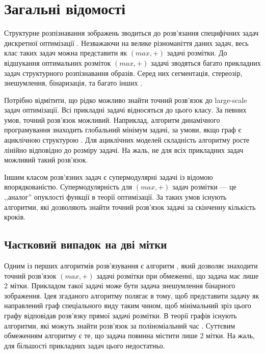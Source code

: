 \section{Загальні відомості}

\vspace{-\baselineskip}

Структурне розпізнавання зображень зводиться до розв'язання специфічних
задач дискретної оптимізації \cite{SchlGig_1_usim2007, Boykov, Boykov_2, savchynskyy}. Незважаючи на велике різноманіття даних задач,
весь клас таких задач можна представити як \((max,+)\) задачі розмітки.
До відшукання оптимальних розміток \((max,+)\) задачі зводяться багато 
прикладних задач структурного розпізнавання образів. Серед них сегментація, 
стереозір, знешумлення, бінаризація, та багато інших \cite{WANG20131610, Boykov_2, comp_vision}.

Потрібно відмітити, що рідко можливо знайти точний розв'язок до 
large-scale задач оптимізації. Всі прикладні задачі відносяться до цього класу.
За певних умов, точний розв'язок можливий. Наприклад, алгоритм динамічного програмування
знаходить глобальний мінімум задачі, за умови, якщо граф є ациклічною
структурою \cite{ten_lectures}. Для ациклічних моделей складність алгоритму росте лінійно 
відповідно до розміру задачі.
На жаль, не для всіх прикладних задач можливий такий розв'язок.

Іншим класом розв'язних задач є супермодулярні задачі із відомою впорядкованістю. Супермодулярність 
для \((max,+)\) задач розмітки --- це ,,аналог'' опуклості функції в теорії
оптимізації. За таких умов існують алгоритми, які дозволяють знайти
точний розв'язок задачі за скінченну кількість кроків.

\subsection{Частковий випадок на дві мітки}
Одним із перших алгоритмів розв'язування є алгоритм \cite{Greig_port}, який 
дозволяє знаходити точний розв'язок \((max,+)\) задачі розмітки при обмеженні, що
задача має лише 2 мітки. Прикладом такої задачі може бути задача знешумлення
бінарного зображення.
Ідея згаданого алгоритму полягає в тому, щоб
представити задачу як направлений граф спеціального виду таким чином, щоб
мінімальний зріз цього графу відповідав розв'язку прямої задачі розмітки.
В теорії графів існують алгоритми, які можуть знайти розв'язок за поліноміальний
час \cite{Boykov, Boykov_2, ford}. Суттєвим обмеженням алгоритму є те, що задача повинна містити лише 2 мітки.
На жаль, для більшості прикладних задач цього недостатньо.


